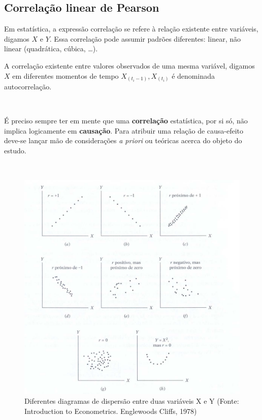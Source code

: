 \documentclass[
]{book}
\begin{document}
\hypertarget{correlauxe7uxe3o-linear-de-pearson}{%
\subsection{Correlação linear de Pearson}\label{correlauxe7uxe3o-linear-de-pearson}}

\hfill\break

Em estatística, a expressão correlação se refere à relação existente entre variáveis, digamos \(X\) e \(Y\). Essa correlação pode assumir padrões diferentes: linear, não linear (quadrática, cúbica, \dots).

\hfill\break

A correlação existente entre valores observados de uma mesma variável, digamos \(X\) em diferentes momentos de tempo \(X_{(t_i-1)}, X_{(t_i)}\) é denominada autocorrelação.

~

É preciso sempre ter em mente que uma \textbf{correlação} estatística, por si só, não implica logicamente em \textbf{causação}. Para atribuir uma relação de causa-efeito deve-se lançar mão de considerações \emph{a priori} ou teóricas acerca do objeto do estudo.

~

\begin{figure}

{\centering \includegraphics[width=1\linewidth]{images8/graficos_correlacoes} 

}

\caption{Diferentes diagramas de dispersão entre duas variáveis X e Y (Fonte: Introduction to Econometrics. Englewoods Cliffs, 1978)}\label{fig:fig2}
\end{figure}
\end{document}
